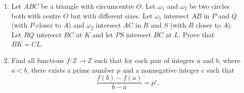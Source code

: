 \documentclass[12pt]{article}
\begin{document}
\begin{enumerate}
\item %
Let $ABC$ be a triangle with circumcentre $O$. Let $\omega_1$ and $\omega_2$ be two circles both with centre $O$ but with different sizes. Let $\omega_1$ intersect $AB$ in $P$ and $Q$ (with $P$ closer to $A$) and $\omega_2$ intersect $AC$ in $R$ and $S$ (with $R$ closer to $A$). Let $RQ$ intersect $BC$ at $K$ and let $PS$ intersect $BC$ at $L$. Prove that $BK = CL$.


\item %
Find all functions $f : \mathbb{Z} \to \mathbb{Z}$ such that for each pair of integers $a$ and $b$, where $a < b$, there exists a prime number $p$ and a nonnegative integer $c$ such that \[ \frac{f(b)-f(a)}{b-a} = p^c. \]


\end{enumerate}
\end{document}
